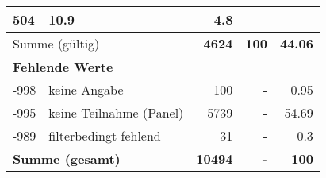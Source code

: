 \begin{longtable}{lXrrr}
       \num{504} &
       \num[round-mode=places,round-precision=2]{10.9} &
         \num[round-mode=places,round-precision=2]{4.8} \\
     \midrule
     \multicolumn{2}{l}{Summe (gültig)} &
       \textbf{\num{4624}} &
     \textbf{\num{100}} &
       \textbf{\num[round-mode=places,round-precision=2]{44.06}} \\
     \multicolumn{5}{l}{\textbf{Fehlende Werte}}\\
       -998 &
       keine Angabe &
         \num{100} &
        - &
         \num[round-mode=places,round-precision=2]{0.95} \\
       -995 &
       keine Teilnahme (Panel) &
         \num{5739} &
        - &
         \num[round-mode=places,round-precision=2]{54.69} \\
       -989 &
       filterbedingt fehlend &
         \num{31} &
        - &
         \num[round-mode=places,round-precision=2]{0.3} \\
     \midrule
     \multicolumn{2}{l}{\textbf{Summe (gesamt)}} &
          \textbf{\num{10494}} &
        \textbf{-} &
        \textbf{\num{100}} \\
     \bottomrule
     \end{longtable}
     
